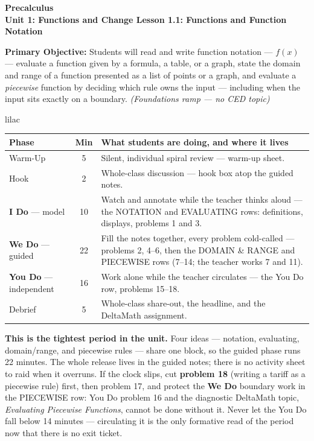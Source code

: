 \documentclass[10pt]{article}
\newcommand{\CourseName}{Precalculus}
\newcommand{\UnitNumberName}{Unit 1: Functions and Change \quad}
\newcommand{\LessonNumberName}{Lesson 1.1: Functions and Function Notation}
\begin{document}
\begin{center}
    {\Large\bfseries \CourseName \\
    {\small\bfseries \UnitNumberName \LessonNumberName}}
\end{center}

\begin{tcolorbox}[colback=lilac, colframe=plum, boxrule=0.9pt, arc=2mm,
    left=2mm, right=2mm, top=1.5mm, bottom=1.5mm]
    \textbf{Primary Objective:} Students will read and write function notation
    --- $f(x)$ --- evaluate a function given by a formula, a table, or a graph,
    state the domain and range of a function presented as a list of points or a
    graph, and evaluate a \textit{piecewise} function by deciding which rule owns
    the input --- including when the input sits exactly on a boundary.
    \hfill\textit{\small (Foundations ramp --- no CED topic)}
\end{tcolorbox}

\boxguard[22]
\begin{skillbox}{lilac}
\small
\renewcommand{\arraystretch}{1.25}
\begin{tabularx}{\linewidth}{@{} l c X @{}}
\textbf{Phase} & \textbf{Min} & \textbf{What students are doing, and where it lives} \\
\midrule
Warm-Up                       & 5  & Silent, individual spiral review --- warm-up sheet. \\
Hook                          & 2  & Whole-class discussion --- hook box atop the guided notes. \\
\textbf{I Do} --- model       & 10 & Watch and annotate while the teacher thinks aloud --- the NOTATION and EVALUATING rows: definitions, displays, problems 1 and 3. \\
\textbf{We Do} --- guided     & 22 & Fill the notes together, every problem cold-called --- problems 2, 4--6, then the DOMAIN \& RANGE and PIECEWISE rows (7--14; the teacher works 7 and 11). \\
\textbf{You Do} --- independent & 16 & Work alone while the teacher circulates --- the You Do row, problems 15--18. \\
Debrief                       & 5  & Whole-class share-out, the headline, and the DeltaMath assignment. \\
\end{tabularx}

\smallskip
\textbf{This is the tightest period in the unit.} Four ideas --- notation,
evaluating, domain/range, and piecewise rules --- share one block, so the guided
phase runs 22 minutes. The whole release lives in the guided notes; there is no
activity sheet to raid when it overruns. If the clock slips, cut \textbf{problem 18}
(writing a tariff as a piecewise rule) first, then problem 17, and protect the
\textbf{We Do} boundary work in the PIECEWISE row: You Do problem 16 and the
diagnostic DeltaMath topic, \textit{Evaluating Piecewise Functions}, cannot be done
without it. Never let the You Do fall below 14 minutes --- circulating it is the
only formative read of the period now that there is no exit ticket.
\end{skillbox}
\end{document}
